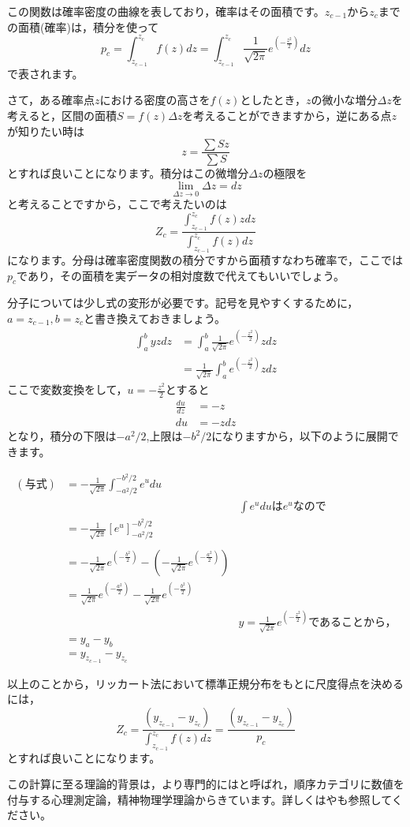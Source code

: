 \documentclass{ltjsbook}
\begin{document}
この関数は確率密度の曲線を表しており，確率はその面積です。$z_{c-1}$から$z_c$までの面積(確率)は，積分を使って
\[
	p_c = \int_{z_{c-1}}^{z_c} f(z) dz = \int_{z_{c-1}}^{z_c}\frac{1}{\sqrt{2\pi}}e^{( -\frac{z^2}{2})} dz
\]
で表されます。

さて，ある確率点$z$における密度の高さを$f(z)$としたとき，$z$の微小な増分$\Delta z$を考えると，区間の面積$S=f(z)\Delta z$を考えることができますから，逆にある点$z$が知りたい時は
\[ z = \frac{\sum Sz}{\sum S}\]
とすれば良いことになります。積分はこの微増分$\Delta z$の極限を
\[ \lim_{\Delta z \to 0}\Delta z = dz \]
と考えることですから，ここで考えたいのは
\[ Z_c = \frac{\int_{z_{c-1}}^{z_c} f(z) z dz}{\int_{z_{c-1}}^{z_c} f(z) dz} \]
になります。分母は確率密度関数の積分ですから面積すなわち確率で，ここでは$p_c$であり，その面積を実データの相対度数で代えてもいいでしょう。

分子については少し式の変形が必要です。記号を見やすくするために，$a=z_{c-1},b=z_c$と書き換えておきましょう。
\[
	\begin{aligned}
		\int_{a}^b y z dz & = \int_a^b \frac{1}{\sqrt{2\pi}}e^{(-\frac{z^2}{2})} z dz  \\
		                  & =  \frac{1}{\sqrt{2\pi}}\int_a^b e^{(-\frac{z^2}{2})} z dz
	\end{aligned}
\]
ここで変数変換をして，$u=-\frac{z^2}{2}$とすると
\[
	\begin{aligned}
		\frac{du}{dz} & = -z   \\
		du            & = -zdz
	\end{aligned}
\]
となり，積分の下限は$-a^2/2$,上限は$-b^2/2$になりますから，以下のように展開できます。

	\begin{align*}
		(与式) & =-\frac{1}{\sqrt{2\pi}}\int_{-a^2/2}^{-b^2/2}e^u du &\\
		     & & \mbox{$\int e^u du$は$e^u$なので}\\
		     & =-\frac{1}{\sqrt{2\pi}}\left[e^u\right]_{-a^2/2}^{-b^2/2}&\\
		     & & \\
		     & =-\frac{1}{\sqrt{2\pi}}e^{(-\frac{b^2}{2})} -\left(-\frac{1}{\sqrt{2\pi}}e^{(-\frac{a^2}{2})}\right) &  \\
		     & =\frac{1}{\sqrt{2\pi}}e^{(-\frac{a^2}{2})}-\frac{1}{\sqrt{2\pi}}e^{(-\frac{b^2}{2})} & \\
		     && \mbox{$y= \frac{1}{\sqrt{2\pi}}e^{(-\frac{z^2}{2})}$であることから，} \\
		     & = y_a - y_b  & \\
		     & = y_{z_{c-1}} - y_{z_c} &
	\end{align*}

以上のことから，リッカート法において標準正規分布をもとに尺度得点を決めるには，
\[ Z_c = \frac{(y_{z_{c-1}} - y_{z_c})}{\int_{z_{c-1}}^{z_c}f(z)dz} = \frac{(y_{z_{c-1}} - y_{z_c})}{p_c} \]
とすれば良いことになります。

この計算に至る理論的背景は，より専門的にはと呼ばれ，順序カテゴリに数値を付与する心理測定論，精神物理学理論からきています。詳しくは\textcite{JPGuilfod}や\textcite{1390001205397311616}も参照してください。
\end{document}

